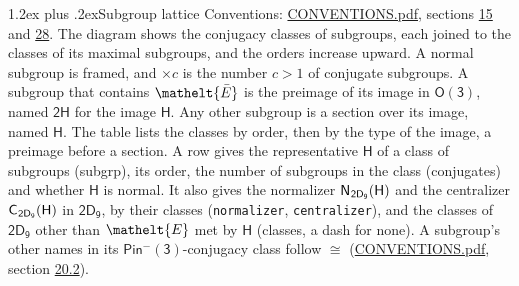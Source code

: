 \documentclass[10pt,a4paper]{article}
\makeatletter
\renewcommand\section{\@startsection{section}{1}{\z@}{-3ex plus -1ex minus -.2ex}%
  {1.2ex plus .2ex}{\normalfont\large\sffamily\bfseries\color{parttitle}}}
\numberwithin{equation}{section}
\newcommand{\eltfont}[1]{{\let\sigma\eltsigma\mathelt{#1}}}
\newcommand{\grp}[1]{\mathsf{#1}}
\newcommand{\cls}[1]{\eltfont{#1}}
\newcommand{\elt}[1]{\eltfont{#1}}
\newcommand{\samecls}{\cong}
\newcommand{\nconj}[1]{{\scriptsize$\times#1$}}
\newcommand{\barred}[1]{\bar{#1}}
\newcommand{\hairsp}{\mkern1mu}
\makeatother
\begin{document}
\section{Subgroup lattice}\label{s:subgroups}
Conventions: \href{../../CONVENTIONS.pdf}{CONVENTIONS.pdf}, sections \href{../../../rotation/CONVENTIONS.pdf\#conv.15}{15} and \href{../../CONVENTIONS.pdf\#conv.28}{28}.
The diagram shows the conjugacy classes of subgroups, each joined to the classes of its maximal subgroups, and the orders increase upward. A normal subgroup is framed, and ${\times}c$ is the number $c > 1$ of conjugate subgroups. \label{n:group.H}A subgroup that contains $\elt{\barred{E}}$ is the preimage of its image in $\grp{O(3)}$, named $\grp{2H}$ for the image $\grp{H}$. Any other subgroup is a section over its image, named $\grp{H}$. The table lists the classes by order, then by the type of the image, a preimage before a section. \label{n:head.subgroup}\label{n:head.order}\label{n:head.conjugates}\label{n:head.normal}A row gives the representative $\grp{H}$ of a class of subgroups (subgrp), its order, the number of subgroups in the class (conjugates) and whether $\grp{H}$ is normal. \label{n:group.normalizer}\label{n:group.centralizer}\label{n:head.classes}It also gives the normalizer $\grp{N}_{\hairsp \grp{2D_{9}}}(\grp{H})$ and the centralizer $\grp{C}_{\hairsp \grp{2D_{9}}}(\grp{H})$ in $\grp{2D_{9}}$, by their classes (\texttt{normalizer}, \texttt{centralizer}), and the classes of $\grp{2D_{9}}$ other than $\cls{E}$ met by $\grp{H}$ (classes, a dash for none). A subgroup's other names in its \href{Pinminus3.pdf}{$\grp{Pin^{-}(3)}$}-conjugacy class follow $\samecls$ (\href{../../CONVENTIONS.pdf}{CONVENTIONS.pdf}, section \href{../../CONVENTIONS.pdf\#conv.20.2}{20.2}).
\begin{center}
\end{center}
\end{document}
